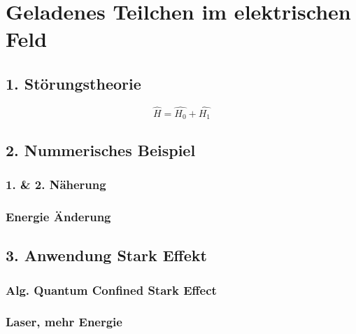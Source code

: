 \chapter{Geladenes Teilchen im elektrischen Feld\label{chapter:efeld}}
\begin{refsection}

\section{ 1. Störungstheorie }

\[
\hat{H} = \hat{H_0} + \hat{H_1}
\]



\section{ 2. Nummerisches Beispiel }

\subsection{ 1. \& 2. Näherung }

\subsection{ Energie Änderung }

\section{ 3. Anwendung Stark Effekt }

\subsection{ Alg. Quantum Confined Stark Effect }

\subsection{ Laser, mehr Energie }

\printbibliography[heading=subbibliography]
\end{refsection}
